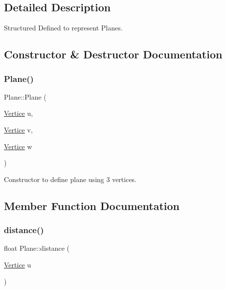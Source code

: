 \subsection{Detailed Description}
Structured Defined to represent Planes. 

\subsection{Constructor \& Destructor Documentation}
\mbox{\label{structPlane_a96a24212b7af50908a3c62f40b9c26c9}} 
\subsubsection{\texorpdfstring{Plane()}{Plane()}}
{\footnotesize\ttfamily Plane\+::\+Plane (\begin{DoxyParamCaption}\item[{\hyperlink{structVertice}{Vertice}}]{u,  }\item[{\hyperlink{structVertice}{Vertice}}]{v,  }\item[{\hyperlink{structVertice}{Vertice}}]{w }\end{DoxyParamCaption})\hspace{0.3cm}{\ttfamily [inline]}}



Constructor to define plane using 3 vertices. 



\subsection{Member Function Documentation}
\mbox{\label{structPlane_a05bbcf26965e39ed9e95a8cb41269f5c}} 
\subsubsection{\texorpdfstring{distance()}{distance()}}
{\footnotesize\ttfamily float Plane\+::distance (\begin{DoxyParamCaption}\item[{\hyperlink{structVertice}{Vertice}}]{u }\end{DoxyParamCaption})\hspace{0.3cm}{\ttfamily [inline]}}

